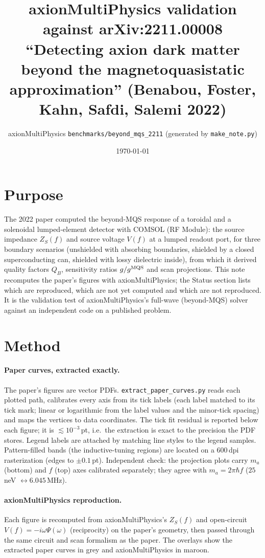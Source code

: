 \documentclass[11pt]{article}
\title{axionMultiPhysics validation against arXiv:2211.00008\\[2pt]\large ``Detecting axion dark matter beyond the magnetoquasistatic approximation'' (Benabou, Foster, Kahn, Safdi, Salemi 2022)}
\author{axionMultiPhysics \texttt{benchmarks/beyond\_mqs\_2211} (generated by \texttt{make\_note.py})}
\date{\today}
\begin{document}
\maketitle

\section{Purpose}
The 2022 paper computed the beyond-MQS response of a toroidal and a solenoidal lumped-element detector with COMSOL
(RF Module): the source impedance $Z_S(f)$ and source voltage $V(f)$ at a lumped readout port, for three boundary
scenarios (unshielded with absorbing boundaries, shielded by a closed superconducting can, shielded with lossy
dielectric inside), from which it derived quality factors $Q_B$, sensitivity ratios $g/g^{\rm MQS}$ and scan
projections. This note recomputes the paper's figures with axionMultiPhysics; the Status section lists which are
reproduced, which are not yet computed and which are not reproduced. It is the validation test of axionMultiPhysics's full-wave
(beyond-MQS) solver against an independent code on a published problem.

\section{Method}
\paragraph{Paper curves, extracted exactly.} The paper's figures are vector PDFs. \texttt{extract\_paper\_curves.py}
reads each plotted path, calibrates every axis from its tick labels (each label matched to its tick mark; linear or
logarithmic from the label values and the minor-tick spacing) and maps the vertices to data coordinates. The tick
fit residual is reported below each figure; it is $\lesssim 10^{-3}$\,pt, i.e.\ the extraction is exact to the
precision the PDF stores. Legend labels are attached by matching line styles to the legend samples. Pattern-filled
bands (the inductive-tuning regions) are located on a 600\,dpi rasterization (edges to $\pm0.1$\,pt). Independent
check: the projection plots carry $m_a$ (bottom) and $f$ (top) axes calibrated separately; they agree with
$m_a = 2\pi\hbar f$ ($25$\,neV $\leftrightarrow 6.045$\,MHz).

\paragraph{axionMultiPhysics reproduction.} Each figure is recomputed from axionMultiPhysics's $Z_S(f)$ and open-circuit
$V(f)=-i\omega\Psi(\omega)$ (reciprocity) on the paper's geometry, then passed through the same circuit and scan
formalism as the paper. The overlays show the extracted paper curves in grey and axionMultiPhysics in maroon.
\end{document}
